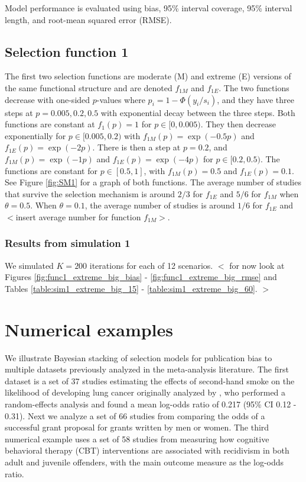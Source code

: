 \documentclass[12pt]{article}   	%
\numberwithin{equation}{section}
\begin{document}
Model performance is evaluated using bias, 95\% interval coverage, 95\% interval length, and root-mean squared error (RMSE). 

\subsection{Selection function 1}

The first two selection functions are moderate (M) and extreme (E) versions of the same functional structure and are denoted $f_{1M}$ and $f_{1E}$. The two functions decrease with one-sided $p$-values where $p_i = 1 - \Phi(y_i / s_i)$, and they have three steps at $p = 0.005, 0.2, 0.5$ with exponential decay between the three steps. Both functions are constant at $f_1(p) = 1$ for $p \in [0, 0.005)$. They then decrease exponentially for $p \in [0.005, 0.2)$ with $f_{1M}(p) = \exp(-0.5p)$ and $f_{1E}(p) = \exp(-2p)$. There is then a step at $p=0.2$, and $f_{1M}(p) = \exp(-1p)$ and $f_{1E}(p) = \exp(-4p)$ for $p \in [0.2, 0.5)$. The functions are constant for $p \in [0.5, 1]$, with $f_{1M}(p) = 0.5$ and $f_{1E}(p) = 0.1$. See Figure \ref{fig:SM1} for a graph of both functions. The average number of studies that survive the selection mechanism is around $2/3$ for $f_{1E}$ and $5/6$ for $f_{1M}$ when $\theta = 0.5$. When $\theta = 0.1$, the average number of studies is around $1/6$ for $f_{1E}$ and $<$insert average number for function $f_{1M} > $. 

\subsubsection{Results from simulation 1}

We simulated $K=200$ iterations for each of 12 scenarios. $<$ for now look at Figures \ref{fig:func1_extreme_big_bias} - \ref{fig:func1_extreme_big_rmse} and Tables \ref{table:sim1_extreme_big_15} - \ref{table:sim1_extreme_big_60}. $>$

\section{Numerical examples} \label{sec:numex}

We illustrate Bayesian stacking of selection models for publication bias to multiple datasets previously analyzed in the meta-analysis literature. The first dataset is a set of 37 studies estimating the effects of second-hand smoke on the likelihood of developing lung cancer originally analyzed by \citet{hackshaw1997}, who performed a random-effects analysis and found a mean log-odds ratio of 0.217 (95\% CI 0.12 - 0.31). Next we analyze a set of 66 studies from \citet{bornmann2007gender} comparing the odds of a successful grant proposal for grants written by men or women. The third numerical example uses a set of 58 studies from \citet{landenberger2005recidivism} measuring how cognitive behavioral therapy (CBT) interventions are associated with recidivism in both adult and juvenile offenders, with the main outcome measure as the log-odds ratio.
\end{document}
